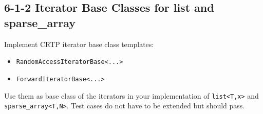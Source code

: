 \documentclass[]{article}
\providecommand{\tightlist}{%
  \setlength{\itemsep}{0pt}\setlength{\parskip}{0pt}}
\begin{document}
\subsection{6-1-2 Iterator Base Classes for list and
sparse\_array}\label{iterator-base-classes-for-list-and-sparseux5farray}

Implement CRTP iterator base class templates:

\begin{itemize}
\tightlist
\item
  \texttt{RandomAccessIteratorBase\textless{}...\textgreater{}}
\item
  \texttt{ForwardIteratorBase\textless{}...\textgreater{}}
\end{itemize}

Use them as base class of the iterators in your implementation of
\texttt{list\textless{}T,x\textgreater{}} and
\texttt{sparse\_array\textless{}T,N\textgreater{}}. Test cases do not
have to be extended but should pass.
\end{document}
